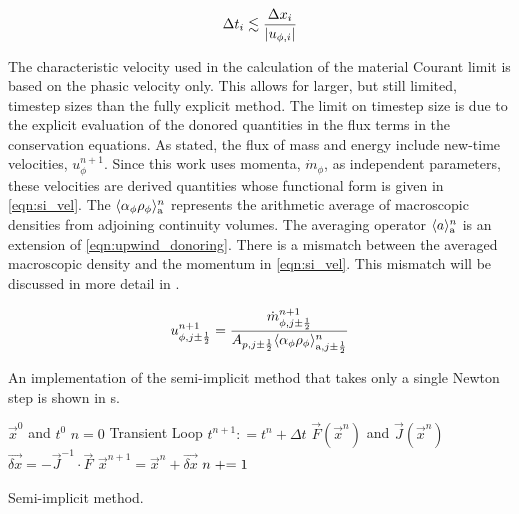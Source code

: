 \begin{equation}
\label{eqn:si_cfl}
\dt{}_i \lesssim \frac{\dx{}_i}{|u_{\phi,i}|}
\end{equation}

The characteristic velocity used in the calculation of the material Courant limit is based on the phasic velocity only.
This allows for larger, but still limited, timestep sizes than the fully explicit method.
The limit on timestep size is due to the explicit evaluation of the donored quantities in the flux terms in the conservation equations.
As stated, the flux of mass and energy include new-time velocities, $u^{n+1}_{\phi}$.
Since this work uses momenta, $\dot{m}_{\phi}$, as independent parameters, these velocities are derived quantities whose functional form is given in \eqref{eqn:si_vel}.
The $\ave{\alpha_{\phi} \rho_{\phi}}^{n}_{\text{a}}$ represents the arithmetic average of macroscopic densities from adjoining continuity volumes.
The averaging operator $\ave{a}^{n}_{\text{a}}$ is an extension of \eqref{eqn:upwind_donoring}.
There is a mismatch between the averaged macroscopic density and the momentum in \eqref{eqn:si_vel}.
This mismatch will be discussed in more detail in .

\begin{equation}
\label{eqn:si_vel}
u^{n+1}_{\phi, j \pm \onehalf} = \frac{\dot{m}^{n+1}_{\phi, j \pm \onehalf}}{A_{p, j \pm \onehalf} \ave{\alpha_{\phi} \rho_{\phi}}^{n}_{\text{a}, j \pm \onehalf}} 
\end{equation}

An implementation of the semi-implicit method that takes only a single Newton step is shown in s.

\begin{algo}[ht!]
\setlength{\baselineskip}{0.625\baselineskip}
\begin{algorithmic}[1]
\Require $\vec{x}^{0}$ and $t^{0}$
\Set $n = 0$
\Loop \; Transient Loop
    \Set $t^{n+1} : = t^{n} + \Delta t$
	\Calculate $\vec{F}(\vec{x}^{n})$ and $\vec{J}(\vec{x}^{n})$
	\Calculate $\vec{\delta x} = - \vec{J}^{-1}\cdot\vec{F}$
	\Calculate $\vec{x}^{n+1} = \vec{x}^{n} + \vec{\delta x}$
	\Set $n \mathrel{+}= 1$
\EndLoop
\end{algorithmic}
\caption{Semi-implicit method.}
\label{alg:si_legacy}
\end{algo}

